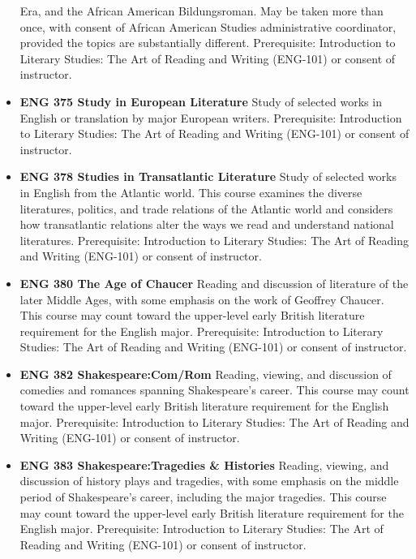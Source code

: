 \documentclass[
  letterpaper,
]{scrbook}
\begin{document}
\begin{itemize}
  Era, and the African American Bildungsroman. May be taken more than
  once, with consent of African American Studies administrative
  coordinator, provided the topics are substantially different.
  Prerequisite: Introduction to Literary Studies: The Art of Reading and
  Writing (ENG-101) or consent of instructor.\\
\item
  \textbf{ENG 375 Study in European Literature} Study of selected works
  in English or translation by major European writers. Prerequisite:
  Introduction to Literary Studies: The Art of Reading and Writing
  (ENG-101) or consent of instructor.\\
\item
  \textbf{ENG 378 Studies in Transatlantic Literature} Study of selected
  works in English from the Atlantic world. This course examines the
  diverse literatures, politics, and trade relations of the Atlantic
  world and considers how transatlantic relations alter the ways we read
  and understand national literatures. Prerequisite: Introduction to
  Literary Studies: The Art of Reading and Writing (ENG-101) or consent
  of instructor.\\
\item
  \textbf{ENG 380 The Age of Chaucer} Reading and discussion of
  literature of the later Middle Ages, with some emphasis on the work of
  Geoffrey Chaucer. This course may count toward the upper-level early
  British literature requirement for the English major. Prerequisite:
  Introduction to Literary Studies: The Art of Reading and Writing
  (ENG-101) or consent of instructor.\\
\item
  \textbf{ENG 382 Shakespeare:Com/Rom} Reading, viewing, and discussion
  of comedies and romances spanning Shakespeare's career. This course
  may count toward the upper-level early British literature requirement
  for the English major. Prerequisite: Introduction to Literary Studies:
  The Art of Reading and Writing (ENG-101) or consent of instructor.\\
\item
  \textbf{ENG 383 Shakespeare:Tragedies \& Histories} Reading, viewing,
  and discussion of history plays and tragedies, with some emphasis on
  the middle period of Shakespeare's career, including the major
  tragedies. This course may count toward the upper-level early British
  literature requirement for the English major. Prerequisite:
  Introduction to Literary Studies: The Art of Reading and Writing
  (ENG-101) or consent of instructor.\\

\end{itemize}
\end{document}
